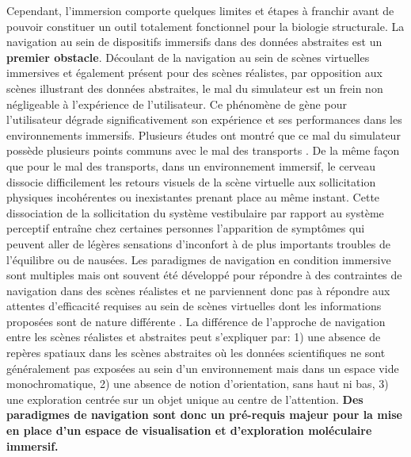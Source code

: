 Cependant, l'immersion comporte quelques limites et étapes à franchir avant de pouvoir constituer un outil totalement fonctionnel pour la biologie structurale. 
La navigation au sein de dispositifs immersifs dans des données abstraites est un \textbf{premier obstacle}. Découlant de la navigation au sein de scènes virtuelles immersives et également présent pour des scènes réalistes, par opposition aux scènes illustrant des données abstraites, le mal du simulateur est un frein non négligeable à l'expérience de l'utilisateur. Ce phénomène de gène pour l'utilisateur dégrade significativement son expérience et ses performances dans les environnements immersifs. Plusieurs études ont montré que ce mal du simulateur possède plusieurs points communs avec le mal des transports \cite{laviola_jr_discussion_2000}. De la même façon que pour le mal des transports, dans un environnement immersif, le cerveau dissocie difficilement les retours visuels de la scène virtuelle aux sollicitation physiques incohérentes ou inexistantes prenant place au même instant. Cette dissociation de la sollicitation du système vestibulaire par rapport au système perceptif \cite{reason1975motion} entraîne chez certaines personnes l'apparition de symptômes qui peuvent aller de légères sensations d'inconfort à de plus importants troubles de l'équilibre ou de nausées. Les paradigmes de navigation en condition immersive sont multiples mais ont souvent été développé pour répondre à des contraintes de navigation dans des scènes réalistes et ne parviennent donc pas à répondre aux attentes d'efficacité requises au sein de scènes virtuelles dont les informations proposées sont de nature différente \cite{trellet_content-guided_2014}. La différence de l'approche de navigation entre les scènes réalistes et abstraites peut s'expliquer par: 1) une absence de repères spatiaux dans les scènes abstraites où les données scientifiques ne sont généralement pas exposées au sein d'un environnement mais dans un espace vide monochromatique, 2) une absence de notion d'orientation, sans haut ni bas, 3) une exploration centrée sur un objet unique au centre de l'attention. 
\textbf{Des paradigmes de navigation sont donc un pré-requis majeur pour la mise en place d'un espace de visualisation et d'exploration moléculaire immersif.}

